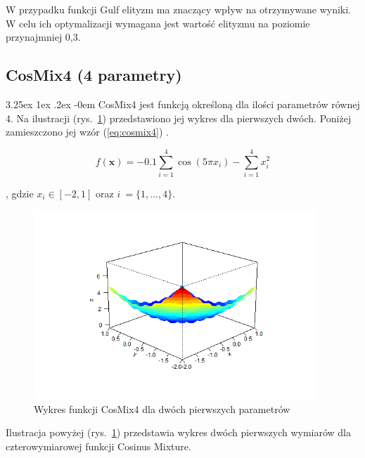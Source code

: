 \documentclass[11pt, a4paper]{article}
\makeatletter
\newcommand{\fbi}{\leavevmode{\parindent=1em\indent}}
\renewcommand\paragraph{\@startsection{paragraph}{5}{\z@}
  {3.25ex \@plus1ex \@minus.2ex}
  {-0em}
  {\normalfont\normalsize\bfseries}}
\makeatother
\begin{document}
\fbi
W przypadku funkcji Gulf elityzm ma znaczący wpływ na otrzymywane wyniki. W celu ich optymalizacji wymagana jest wartość elityzmu na poziomie przynajmniej 0,3.

\newpage
\subsection{CosMix4 (4 parametry)}
\paragraph{}
CosMix4 jest funkcją określoną dla ilości parametrów równej 4. Na ilustracji (rys.~\ref{fig:cosmix41}) przedstawiono jej wykres dla pierwszych dwóch. Poniżej zamieszczono jej wzór (\ref{eq:cosmix4}) \cite{test4}.

\begin{equation}\label{eq:cosmix4}
f(\boldsymbol{x}) = -0.1 \sum_{i=1}^{4} \cos (5 \pi x_i) - \sum_{i=1}^{4} x_i^2
\end{equation}

, gdzie $ x_i \in [-2, 1] $ oraz $ i~= \{1, ... ,4\} $.

\begin{figure}[H]
	\begin{center}
		\includegraphics[width=0.95\textwidth]{./assets/CosMix41.png}
		\caption{Wykres funkcji CosMix4 dla dwóch pierwszych parametrów}
		\label{fig:cosmix41}
	\end{center}
\end{figure}

\fbi
Ilustracja powyżej (rys.~\ref{fig:cosmix41}) przedstawia wykres dwóch pierwszych wymiarów dla czterowymiarowej funkcji Cosinus Mixture. 
\end{document}
